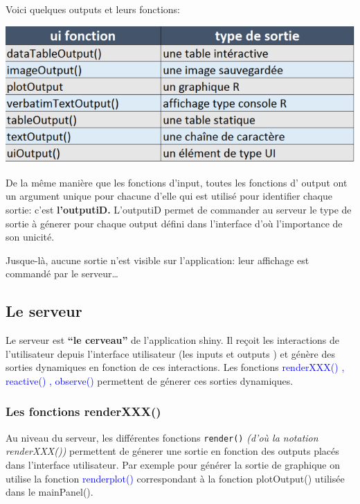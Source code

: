 \documentclass[
]{article}
\begin{document}
Voici quelques outputs et leurs fonctions:

\includegraphics{images/clipboard-2232403312.png}

De la même manière que les fonctions d'input, toutes les fonctions d'
output ont un argument unique pour chacune d'elle qui est utilisé pour
identifier chaque sortie: c'est \textbf{l'outputiD.} L'outputiD permet
de commander au serveur le type de sortie à génerer pour chaque output
défini dans l'interface d'où l'importance de son unicité.

Jusque-là, aucune sortie n'est visible sur l'application: leur affichage
est commandé par le serveur\ldots{}

\hypertarget{le-serveur}{%
\subsection{Le serveur}\label{le-serveur}}

Le serveur est \textbf{``le cerveau''} de l'application shiny. Il reçoit
les interactions de l'utilisateur depuis l'interface utilisateur (les
inputs et outputs ) et génère des sorties dynamiques en fonction de ces
interactions. Les fonctions
\textcolor{blue}{renderXXX() , reactive() , observe()} permettent de
génerer ces sorties dynamiques.

\hypertarget{les-fonctions-renderxxx}{%
\subsubsection{Les fonctions
renderXXX()}\label{les-fonctions-renderxxx}}

Au niveau du serveur, les différentes fonctions \texttt{render()}
\emph{(d'où la notation renderXXX())} permettent de génerer une sortie
en fonction des outputs placés dans l'interface utilisateur. Par exemple
pour générer la sortie de graphique on utilise la fonction
\textcolor{blue}{renderplot()} correspondant à la fonction plotOutput()
utilisée dans le mainPanel().
\end{document}
